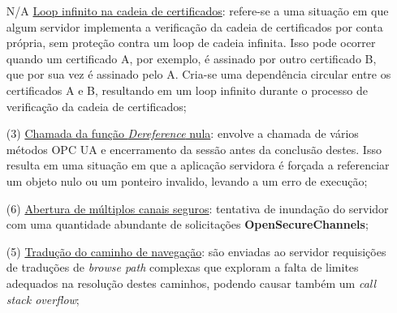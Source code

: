     \begin{itemize}
        \item[N/A] \underline{Loop infinito na cadeia de certificados}: refere-se a uma situação em que algum servidor implementa a verificação da cadeia de certificados por conta própria, sem proteção contra um loop de cadeia infinita. Isso pode ocorrer quando um certificado A, por exemplo, é assinado por outro certificado B, que por sua vez é assinado pelo A. Cria-se uma dependência circular entre os certificados A e B, resultando em um loop infinito durante o processo de verificação da cadeia de certificados;
        \item[(3)] \underline{Chamada da função \textit{Dereference} nula}: envolve a chamada de vários métodos OPC UA e encerramento da sessão antes da conclusão destes. Isso resulta em uma situação em que a aplicação servidora é forçada a referenciar um objeto nulo ou um ponteiro invalido, levando a um erro de execução;
        \item[(6)] \underline{Abertura de múltiplos canais seguros}: tentativa de inundação do servidor com uma quantidade abundante de solicitações \textbf{OpenSecureChannels};
        \item[(5)] \underline{Tradução do caminho de navegação}: são enviadas ao servidor requisições de traduções de \textit{browse path} complexas que exploram a falta de limites adequados na resolução destes caminhos, podendo causar também um \textit{call stack overflow};

\end{itemize}

